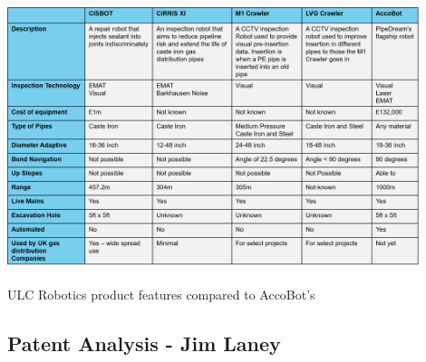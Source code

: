 \documentclass[11pt]{article}		%
\newcommand{\supercite}[1]{\textsuperscript{\cite{#1}}}		%
\begin{document}
            \begin{table}[h]
				\centering
				\includegraphics[width=0.9\textwidth]{ULC_robot_comparison_formatted}
				\caption{ULC Robotics product features compared to AccoBot's\supercite{ULC_Robots}}
				\label{ULCFeatures}
			\end{table}
        
	\subsection[Patent Analysis]{Patent Analysis - Jim Laney} \label{patentAnalysis}
        
\end{document}
